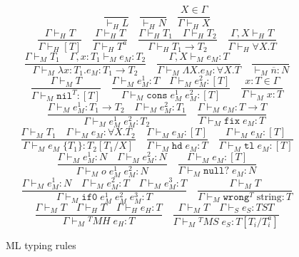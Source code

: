 \begin{figure}[p]
\[
\frac{}{\vdash_{H}L}
\quad
\frac{}{\vdash_{H}N}
\quad
\frac{X\in\Gamma}{\Gamma\vdash_{H}X}
\]
\[
\frac{\Gamma\vdash_{H}T}{\Gamma\vdash_{H}[T]}
\quad
\frac{\Gamma\vdash_{H}T}{\Gamma\vdash_{H}T^{a}}
\quad
\frac{\Gamma\vdash_{H}T_{1}\quad\Gamma\vdash_{H}T_{2}}{\Gamma\vdash_{H}T_{1}\rightarrow T_{2}}
\quad
\frac{\Gamma ,X\vdash_{H}T}{\Gamma\vdash_{H}\forall X.T}
\]
\bigskip
\[
\frac{\Gamma\vdash_{M}T_{1}\quad\Gamma,x:T_{1}\vdash_{M}e_{M}:T_{2}}{\Gamma\vdash_{M}\lambda x:T_{1}.e_{M}:T_{1}\rightarrow T_{2}}
\quad
\frac{\Gamma,X\vdash_{M}e_{M}:T}{\Gamma\vdash_{M}\Lambda X.e_{M}:\forall X.T}
\quad
\frac{}{\vdash_{M}\overline{n}:N}
\]
\[
\frac{\Gamma\vdash_{M}T}{\Gamma\vdash_{M}\mathtt{nil}^{T}:[T]}
\quad
\frac{\Gamma\vdash_{M}e_{M}^{1}:T\quad\Gamma\vdash_{M}e_{M}^{2}:[T]}{\Gamma\vdash_{M}\mathtt{cons}\;e_{M}^{1}\;e_{M}^{2}:[T]}
\quad
\frac{x:T\in\Gamma}{\Gamma\vdash_{M}x:T}
\]
\[
\frac{\Gamma\vdash_{M}e_{M}^{1}:T_{1}\rightarrow T_{2}\quad\Gamma\vdash_{M}e_{M}^{2}:T_{1}}{\Gamma\vdash_{M}e_{M}^{1}\;e_{M}^{2}:T_{2}}
\quad
\frac{\Gamma\vdash_{M}e_{M}:T\rightarrow T}{\Gamma\vdash_{M}\mathtt{fix}\;e_{M}:T}
\]
\[
\frac{\Gamma\vdash_{M}T_{1}\quad\Gamma\vdash_{M}e_{M}:\forall X.T_{2}}{\Gamma\vdash_{M}e_{M}\;\lbrace T_{1}\rbrace:T_{2}[T_{1}/X]}
\quad
\frac{\Gamma\vdash_{M}e_{M}:[T]}{\Gamma\vdash_{M}\mathtt{hd}\;e_{M}:T}
\quad
\frac{\Gamma\vdash_{M}e_{M}:[T]}{\Gamma\vdash_{M}\mathtt{tl}\;e_{M}:[T]}
\]
\[
\frac{\Gamma\vdash_{M}e_{M}^{1}:N\quad\Gamma\vdash_{M}e_{M}^{2}:N}{\Gamma\vdash_{M}o\;e_{M}^{1}\;e_{M}^{2}:N}
\quad
\frac{\Gamma\vdash_{M}e_{M}:[T]}{\Gamma\vdash_{M}\mathtt{null?}\;e_{M}:N}
\]
\[
\frac{\Gamma\vdash_{M}e_{M}^{1}:N\quad\Gamma\vdash_{M}e_{M}^{2}:T\quad\Gamma\vdash_{M}e_{M}^{3}:T}{\Gamma\vdash_{M}\mathtt{if0}\;e_{M}^{1}\;e_{M}^{2}\;e_{M}^{3}:T}
\quad
\frac{\Gamma\vdash_{M}T}{\Gamma\vdash_{M}\mathtt{wrong}^{T}\;\mathrm{string}:T}
\]
\[
\frac{\Gamma\vdash_{M}T\quad\Gamma\vdash_{H}T\quad\Gamma\vdash_{H}e_{H}:T}{\Gamma\vdash_{M}{^{T}M}H\;e_{H}:T}
\quad
\frac{\Gamma\vdash_{M}T\quad\Gamma\vdash_{S}e_{S}:TST}{\Gamma\vdash_{M}{^{T}M}S\;e_{S}:T[T_{i}/T^{a}_{i}]}
\]
\caption{ML typing rules}
\label{mtr}
\end{figure}